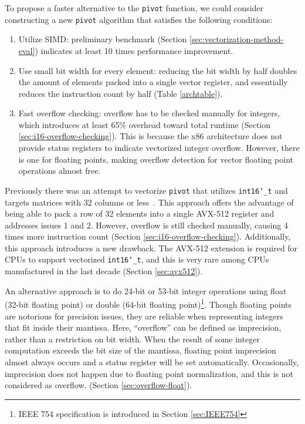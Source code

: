 \documentclass[logo,bsc,singlespacing,parskip]{infthesis}
\newcommand{\dtshort}{\texttt{int16\char`_t}}
\begin{document}
To propose a faster alternative to the \texttt{pivot} function, we could
consider constructing a new \texttt{pivot} algorithm that satisfies the
following conditions:
\begin{enumerate}

\item Utilize SIMD: preliminary benchmark (Section
\ref{sec:vectorization-method-eval}) indicates at least 10 times
performance improvement. 

\item Use small bit width for every element: reducing the bit width by half
doubles the amount of elements packed into a single vector register, and
essentially reduces the instruction count by half (Table \ref{archtable}). 

\item Fast overflow checking: overflow has to be checked manually for integers,
which introduces at least 65\% overhead toward total runtime (Section
\ref{sec:i16-overflow-checking}). This is because the x86 architecture does not
provide status registers to indicate vectorized integer overflow. However, there
is one for floating points, making overflow detection for vector floating point
operations almost free. 

\end{enumerate}


Previously there was an attempt to vectorize \texttt{pivot} that utilizes
\dtshort{} and targets matrices with 32 columns or less~\cite{FPL2}. This
approach offers the advantage of being able to pack a row of 32 elements into a
single AVX-512 register and addresses issues 1 and 2. However, overflow
is still checked manually, causing 4 times more instruction count (Section
\ref{sec:i16-overflow-checking}). Additionally, this approach introduces a new
drawback. The AVX-512 extension is required for CPUs to support
vectorized \dtshort{}, and this is very rare among CPUs manufactured in the last
decade (Section \ref{sec:avx512}). 

An alternative approach is to do 24-bit or 53-bit integer operations using float
(32-bit floating point) or double (64-bit floating point)\footnote{ IEEE 754 specification is introduced in Section
\ref{sec:IEEE754}}. 
Though
floating points are notorious for precision issues, they are reliable when
representing integers that fit inside their mantissa. 
Here, ``overflow'' can be defined as imprecision, rather than a restriction on 
bit width. 
When the result of some integer computation exceeds the bit
size of the mantissa, floating point imprecision almost always occurs and a
status register will be set automatically. Occasionally, imprecision does not
happen due to floating point normalization, and this is not considered as
overflow.
(Section \ref{sec:overflow-float}).
\end{document}
